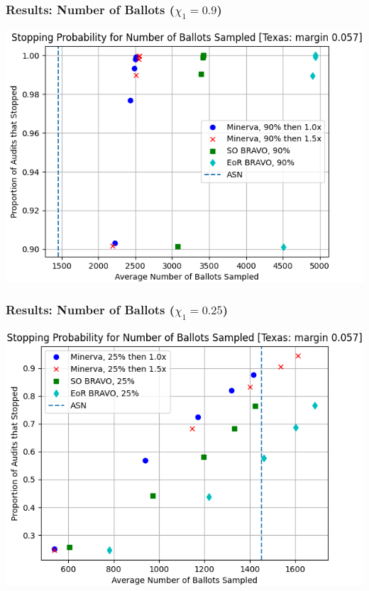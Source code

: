 \documentclass[aspectratio=169]{beamer}
\begin{document}
\begin{frame}
\frametitle{Results: Number of Ballots ($\chi_1=0.9$)}
\centering

\pause 

\hspace{-2cm}
\includegraphics[width=.8\textwidth]{texas90.png}
\end{frame}

\begin{frame}
\frametitle{Results: Number of Ballots ($\chi_1=0.25$)}

\centering

\hspace{-2cm}
\includegraphics[width=.8\textwidth]{texas25.png}
\end{frame}
\end{document}
